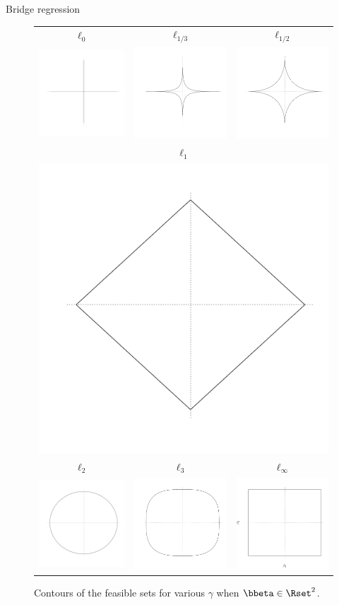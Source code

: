 \documentclass{beamer}\usepackage[]{graphicx}\usepackage[]{color}
\begin{document}
\begin{frame}{Bridge regression}

  \begin{figure}[htbp!]
    \centering
    \begin{tabular}{ccc}
      $\ell_0$ & $\ell_{1/3}$ & $\ell_{1/2}$ \\
      \includegraphics[width=.125\textwidth]{figures/ell0ball}
      & \includegraphics[width=.125\textwidth]{figures/ell13ball}
      & \includegraphics[width=.125\textwidth]{figures/ell12ball} \\
      \multicolumn{3}{c}{$\ell_1$} \\
      \multicolumn{3}{c}{\includegraphics[width=.125\textwidth]{figures/ell1ball}} \\
      $\ell_2$ & $\ell_3$ & $\ell_\infty$ \\
      \includegraphics[width=.125\textwidth]{figures/ell2ball}
      & \includegraphics[width=.125\textwidth]{figures/ell3ball}
      & \includegraphics[width=.125\textwidth]{figures/ellinfball} \\
    \end{tabular}
    \caption{Contours of the feasible sets for various  $\gamma$ when $\bbeta\in\Rset^2$.}
    \label{fig:bridge_set}
  \end{figure}
  
\end{frame}
\end{document}
